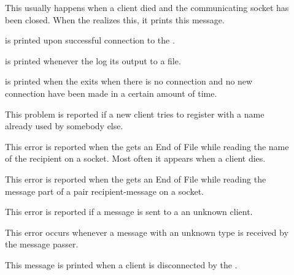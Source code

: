\begin{description}

\item[]
This usually happens when a client died and the communicating socket
has been closed. When the \MP{} realizes this, it prints this message.

\item[] is printed upon
    successful connection to the \MP{}.

\item[] is printed whenever the \MP{} log
    its output to a file.

\item[]
    is printed when the \MP{} exits when there is no connection  and no new
    connection have been made in a certain amount of time.

\item[]
This problem is reported if a new client tries to register
with a name already used by somebody else.

\item[]
This error is reported when the \MP{} gets an End of File while
reading the name of the recipient on a socket. Most often it appears
when a client dies.

\item[]
This error is reported when the \MP{} gets an End of File while
reading the message part of a pair recipient-message on a socket.

\item[]
This error is reported if a message is sent to a an unknown client.

\item[] This
    error occurs whenever a message with an unknown type is received by the
    message passer.

\item[] This
    message is printed when a client is disconnected by the \MP{}.


\end{description}

